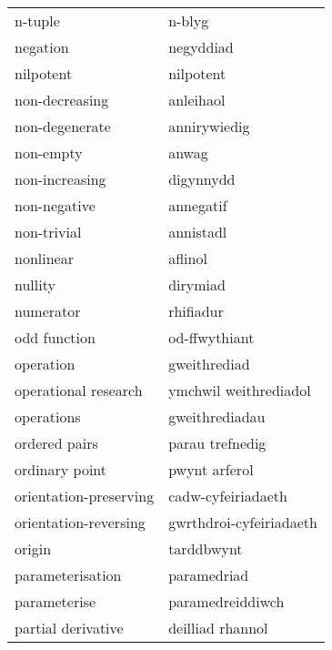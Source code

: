 \begin{supertabular}{p{0.22\textwidth}p{0.22\textwidth}}
                         n-tuple &                          n-blyg \\
                        negation &                       negyddiad \\
                       nilpotent &                       nilpotent \\
                  non-decreasing &                       anleihaol \\
                  non-degenerate &                    annirywiedig \\
                       non-empty &                           anwag \\
                  non-increasing &                       digynnydd \\
                    non-negative &                       annegatif \\
                     non-trivial &                       annistadl \\
                       nonlinear &                         aflinol \\
                         nullity &                        dirymiad \\
                       numerator &                       rhifiadur \\
                    odd function &                   od-ffwythiant \\
                       operation &                    gweithrediad \\
            operational research &           ymchwil weithrediadol \\
                      operations &                  gweithrediadau \\
                   ordered pairs &                 parau trefnedig \\
                  ordinary point &                   pwynt arferol \\
          orientation-preserving &              cadw-cyfeiriadaeth \\
           orientation-reversing &         gwrthdroi-cyfeiriadaeth \\
                          origin &                      tarddbwynt \\
                parameterisation &                     paramedriad \\
                    parameterise &                paramedreiddiwch \\
              partial derivative &                deilliad rhannol \\

\end{supertabular}
